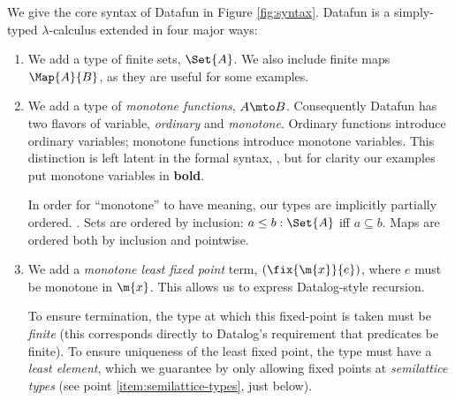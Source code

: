 We give the core syntax of Datafun in Figure \ref{fig:syntax}. Datafun is a
simply-typed $\lambda$-calculus extended in four major ways:

\begin{enumerate}
\item We add a type of finite sets, $\Set{A}$. We also include finite maps
  $\Map{A}{B}$, as they are useful for some examples. 


\item We add a type of \emph{monotone functions}, $A \mto B$. Consequently
  Datafun has two flavors of variable, \emph{ordinary} and \emph{monotone}.
  Ordinary functions introduce ordinary variables; monotone functions introduce
  monotone variables. This distinction is left latent in the formal syntax,
  , but for clarity our examples put monotone variables in
  \textbf{bold}.

  In order for ``monotone'' to have meaning, our types are implicitly partially
  ordered. . Sets are ordered by inclusion: $a \le b :
  \Set{A}$ iff $a \subseteq b$. Maps are ordered both by inclusion and
  pointwise.

\item We add a \emph{monotone least fixed point} term, $(\fix{\m{x}}{e})$,
  where $e$ must be monotone in $\m{x}$. This allows us to express
  Datalog-style recursion.


  To ensure termination, the type at which this fixed-point is taken must be
  \emph{finite} (this corresponds directly to Datalog's requirement that
  predicates be finite). To ensure uniqueness of the least fixed point, the type
  must have a \emph{least element}, which we guarantee by only allowing fixed
  points at \emph{semilattice types} (see point \ref{item:semilattice-types},
  just below).


\end{enumerate}
